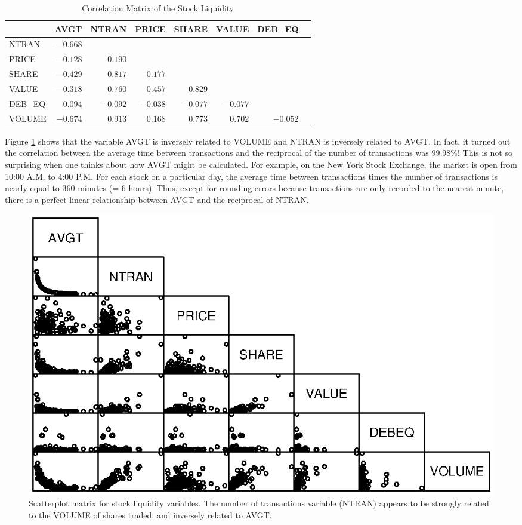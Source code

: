 \begin{table}[h]

\caption{\label{T5:LiquidCorr} Correlation Matrix of the Stock
Liquidity}
\begin{tabular}{lrrrrrrr}
\hline & AVGT & NTRAN & PRICE & SHARE & VALUE & DEB\_EQ \\ \hline
\multicolumn{1}{l}{NTRAN} & $-0.668$ &  &  &  &  &  \\
\multicolumn{1}{l}{PRICE} & $-0.128$ & $0.190$ &  &  &  &  \\
\multicolumn{1}{l}{SHARE} & $-0.429$ & $0.817$ & $0.177$ &  &  &  \\
\multicolumn{1}{l}{VALUE} & $-0.318$ & $0.760$ & $0.457$ & $0.829$ &  &  \\
\multicolumn{1}{l}{DEB\_EQ} & $0.094$ & $-0.092$ & $-0.038$ & $-0.077$ & $%
-0.077$ &  \\
\multicolumn{1}{l}{VOLUME} & $-0.674$ & $0.913$ & $0.168$ & $0.773$ & $0.702$
& $-0.052$ \\ \hline
\end{tabular}
\end{table}

Figure \ref{F5:LiquidPlot} shows that the variable AVGT is inversely
related to VOLUME and NTRAN is inversely related to AVGT. In fact,
it turned out the correlation between the average time between
transactions and the reciprocal of the number of transactions was
$99.98\%$! This is not so surprising when one thinks about how AVGT
might be calculated. For example, on the New York Stock Exchange,
the market is open from 10:00 A.M. to 4:00 P.M. For each stock on a
particular day, the average time between transactions times the
number of transactions is nearly equal to 360 minutes (= 6 hours).
Thus, except for rounding errors because transactions are only
recorded to the nearest minute, there is a perfect linear
relationship between AVGT and the reciprocal of NTRAN.


\begin{figure}[htp]
  \begin{center}
    \includegraphics[width=1\textwidth]{Chapter5/F5LiquidPlot.eps}
    \caption{\label{F5:LiquidPlot} \small  Scatterplot matrix for
stock liquidity variables. The number of transactions variable
(NTRAN) appears to be strongly related to the VOLUME of shares
traded, and inversely related to AVGT.}
  \end{center}
\end{figure}


